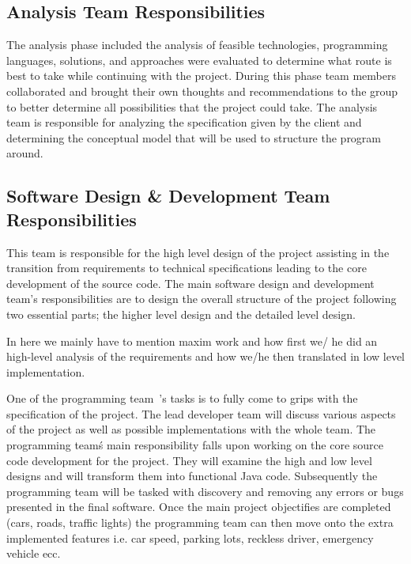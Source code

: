 \documentclass[oneside]{article}
\begin{document}
\subsection{Analysis Team Responsibilities}

The analysis phase included the analysis of feasible technologies, programming languages, solutions, and approaches were evaluated to determine what route is best to take while continuing with the project. During this phase team members collaborated and brought their own thoughts and recommendations to the group to better determine all possibilities that the project could take. 
The analysis team is responsible for analyzing the specification given by the client and determining the conceptual model that will be used to structure the program around.



\subsection{Software Design \& Development Team Responsibilities}

This team is responsible for the high level design of the project assisting in the transition from requirements to technical specifications leading to the core development of the source code. The main software design and development team's responsibilities are to design the overall structure of the project following two essential parts; the higher level design and the detailed level design. 
\newline

\noindent In here we mainly have to mention maxim work and how first we/ he did an high-level analysis of the requirements and how we/he then translated in low level implementation.
\newline


\noindent One of the programming team\ 's tasks is to fully come to grips with the specification of the project. The lead developer team will discuss various aspects of the project as well as possible implementations with the whole team. 
The programming team\'s main responsibility falls upon working on the core source code development for the project. They will examine the high and low level designs and will transform them into functional Java code. 
Subsequently the programming team will be tasked with discovery and removing any errors or bugs presented in the final software.
Once the main project objectifies are completed (cars, roads, traffic lights) the programming team can then move onto the extra implemented features i.e.  car speed, parking lots, reckless driver, emergency vehicle ecc.
\end{document}
